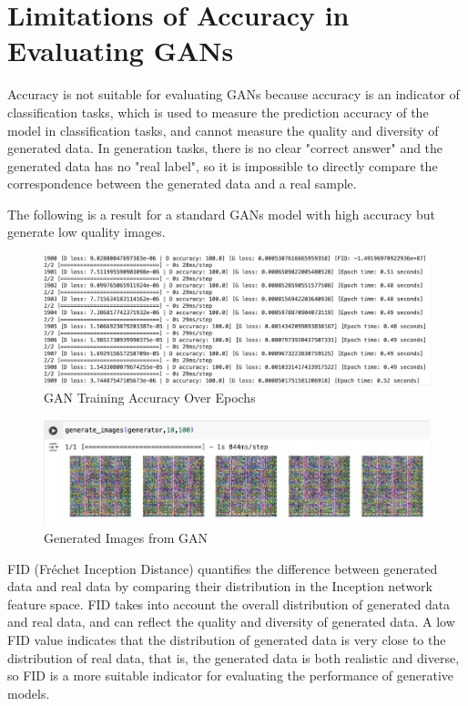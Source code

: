 \section{Limitations of Accuracy in Evaluating GANs}
Accuracy is not suitable for evaluating GANs because accuracy is an indicator of classification tasks, 
which is used to measure the prediction accuracy of the model in classification tasks, and cannot 
measure the quality and diversity of generated data. In generation tasks, there is no clear 
"correct answer" and the generated data has no "real label", so it is impossible to directly 
compare the correspondence between the generated data and a real sample. 

The following is a result for a standard GANs model with high accuracy but generate low quality images.


\begin{figure}[H]
    \centering
    \includegraphics[width=1.2\linewidth]{./Images/model_accuracy.jpg}
    \caption{GAN Training Accuracy Over Epochs}
    \label{fig:my_picture}
\end{figure}

\begin{figure}[H]
    \centering
    \includegraphics[width=1.2\linewidth]{./Images/generate_images.jpg}
    \caption{Generated Images from GAN}
    \label{fig:my_picture}
\end{figure}


FID (Fréchet Inception Distance) quantifies the difference between generated data and real 
data by comparing their distribution in the Inception network feature space. FID takes into 
account the overall distribution of generated data and real data, and can reflect the quality 
and diversity of generated data. A low FID value indicates that the distribution of generated 
data is very close to the distribution of real data, that is, the generated data is both realistic 
and diverse, so FID is a more suitable indicator for evaluating the performance of generative models.